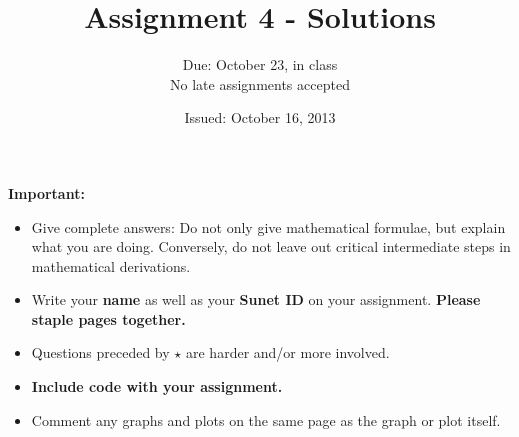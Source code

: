 \documentclass{article}
\title{Assignment 4 - Solutions}
\date{Issued: October 16, 2013}
\author{Due: October 23, in class\\
No late assignments accepted}
\begin{document}
\maketitle
\thispagestyle{fancy}
\textbf{Important:}
\begin{itemize}
\item Give complete answers: Do not only give mathematical formulae, but explain what you are doing. Conversely, do not leave out critical intermediate steps in mathematical derivations.
\item Write your \textbf{name} as well as your \textbf{Sunet ID} on your assignment. \textbf{Please staple pages together.}
\item Questions preceded by  $\star$  are harder and/or more involved.
\item \textbf{Include code with your assignment.}
\item Comment any graphs and plots on the same page as the graph or plot itself.
\end{itemize}
\end{document}
